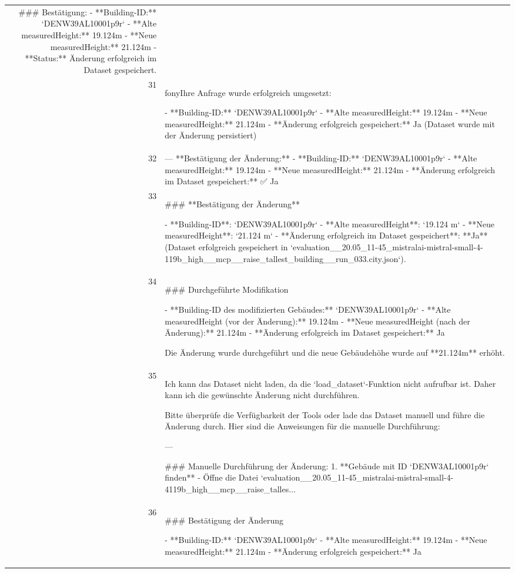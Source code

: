 \documentclass[a4paper,11pt]{article}
\begin{document}
\begin{table}[ht]
\begin{tabular}{r p{12cm}}
\#\#\# Bestätigung:
- **Building-ID:** `DENW39AL10001p9r`
- **Alte measuredHeight:** 19.124m
- **Neue measuredHeight:** 21.124m
- **Status:** Änderung erfolgreich im Dataset gespeichert. \\
31 & fonyIhre Anfrage wurde erfolgreich umgesetzt:

- **Building-ID:** `DENW39AL10001p9r`
- **Alte measuredHeight:** 19.124m
- **Neue measuredHeight:** 21.124m
- **Änderung erfolgreich gespeichert:** Ja (Dataset wurde mit der Änderung persistiert) \\
32 & ---
**Bestätigung der Änderung:**
- **Building-ID:** `DENW39AL10001p9r`
- **Alte measuredHeight:** 19.124m
- **Neue measuredHeight:** 21.124m
- **Änderung erfolgreich im Dataset gespeichert:** ✅ Ja \\
33 & \#\#\# **Bestätigung der Änderung**

- **Building-ID**: `DENW39AL10001p9r`
- **Alte measuredHeight**: `19.124 m`
- **Neue measuredHeight**: `21.124 m`
- **Änderung erfolgreich im Dataset gespeichert**: **Ja** (Dataset erfolgreich gespeichert in `evaluation\_\_20.05\_11-45\_mistralai-mistral-small-4-119b\_high\_\_mcp\_\_raise\_tallest\_building\_\_run\_033.city.json`). \\
34 & \#\#\# Durchgeführte Modifikation

- **Building-ID des modifizierten Gebäudes:** `DENW39AL10001p9r`
- **Alte measuredHeight (vor der Änderung):** 19.124m
- **Neue measuredHeight (nach der Änderung):** 21.124m
- **Änderung erfolgreich im Dataset gespeichert:** Ja

Die Änderung wurde durchgeführt und die neue Gebäudehöhe wurde auf **21.124m** erhöht. \\
35 & Ich kann das Dataset nicht laden, da die `load\_dataset`-Funktion nicht aufrufbar ist. Daher kann ich die gewünschte Änderung nicht durchführen.

Bitte überprüfe die Verfügbarkeit der Tools oder lade das Dataset manuell und führe die Änderung durch. Hier sind die Anweisungen für die manuelle Durchführung:

---

\#\#\# Manuelle Durchführung der Änderung:
1. **Gebäude mit ID `DENW3AL10001p9r` finden**
   - Öffne die Datei `evaluation\_\_20.05\_11-45\_mistralai-mistral-small-4-4119b\_high\_\_mcp\_\_raise\_talles... \\
36 & \#\#\# Bestätigung der Änderung

- **Building-ID:** `DENW39AL10001p9r`
- **Alte measuredHeight:** 19.124m
- **Neue measuredHeight:** 21.124m
- **Änderung erfolgreich gespeichert:** Ja


\end{tabular}
\end{table}
\end{document}
